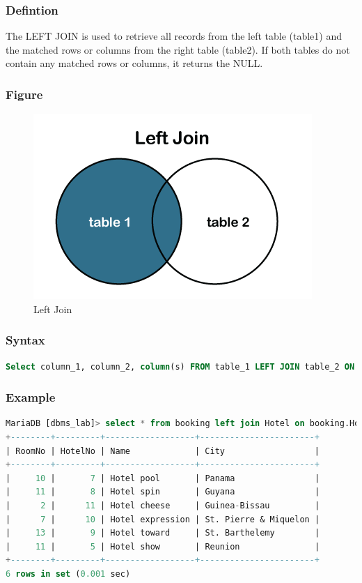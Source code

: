 \documentclass[11pt]{article}
\begin{document}
\subsubsection*{Defintion}

The LEFT JOIN is used to retrieve all records from the left table (table1) and the matched rows or columns from the right table (table2). If both tables do not contain any matched rows or columns, it returns the NULL.

\subsubsection*{Figure}

\begin{figure}[H]
	\centering
	\includegraphics[width=.45\textwidth]{left join.png}
	\caption{ Left Join}
\end{figure}

\subsubsection*{Syntax}

\begin{lstlisting}[language=sql]
Select column_1, column_2, column(s) FROM table_1 LEFT JOIN table_2 ON table_1.column_name = table_2.column_name;  
\end{lstlisting}

\subsubsection*{Example}

\begin{lstlisting}[language=sql]
MariaDB [dbms_lab]> select * from booking left join Hotel on booking.HotelNo = Hotel.HotelNo;
+--------+---------+------------------+-----------------------+
| RoomNo | HotelNo | Name             | City                  |
+--------+---------+------------------+-----------------------+
|     10 |       7 | Hotel pool       | Panama                |
|     11 |       8 | Hotel spin       | Guyana                |
|      2 |      11 | Hotel cheese     | Guinea-Bissau         |
|      7 |      10 | Hotel expression | St. Pierre & Miquelon |
|     13 |       9 | Hotel toward     | St. Barthelemy        |
|     11 |       5 | Hotel show       | Reunion               |
+--------+---------+------------------+-----------------------+
6 rows in set (0.001 sec)
\end{lstlisting}
\end{document}
